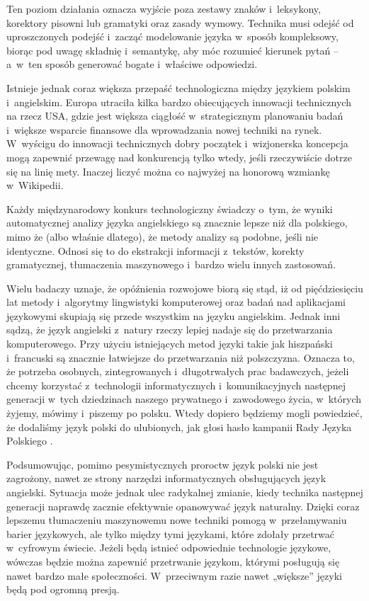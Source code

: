 \begin{multicols}{2}
Ten poziom działania oznacza wyjście poza zestawy znaków
i~leksykony, korektory pisowni lub gramatyki oraz zasady wymowy.
Technika musi odejść od uproszczonych podejść i~zacząć
modelowanie języka w~sposób kompleksowy, biorąc pod uwagę
składnię i~semantykę, aby móc rozumieć kierunek pytań -- a~w~ten
sposób generować bogate i~właściwe odpowiedzi. 

Istnieje jednak coraz większa przepaść technologiczna między
językiem polskim i~angielskim. Europa utraciła kilka bardzo
obiecujących innowacji technicznych na rzecz USA, gdzie jest większa
ciągłość w~strategicznym planowaniu badań i~większe wsparcie
finansowe dla wprowadzania nowej techniki na rynek. W~wyścigu do
innowacji technicznych dobry początek i~wizjonerska koncepcja mogą
zapewnić przewagę nad konkurencją tylko wtedy, jeśli rzeczywiście
dotrze się na linię mety. Inaczej liczyć można co najwyżej na
honorową wzmiankę w~Wikipedii. 

Każdy międzynarodowy konkurs technologiczny świadczy o~tym, że
wyniki automatycznej analizy języka angielskiego są znacznie lepsze
niż dla polskiego, mimo że (albo właśnie dlatego), że metody
analizy są podobne, jeśli nie identyczne. Odnosi się to do
ekstrakcji informacji z~tekstów, korekty gramatycznej, tłumaczenia
maszynowego i~bardzo wielu innych zastosowań. 

Wielu badaczy uznaje, że opóźnienia rozwojowe biorą się stąd,
iż od pięćdziesięciu lat metody i~algorytmy lingwistyki
komputerowej oraz badań nad aplikacjami językowymi skupiają się
przede wszystkim na języku angielskim. Jednak inni sądzą, że
język angielski z~natury rzeczy lepiej nadaje się do przetwarzania
komputerowego. Przy użyciu istniejących metod języki takie jak
hiszpański i~francuski są znacznie łatwiejsze do przetwarzania niż
polszczyzna. Oznacza to, że potrzeba osobnych, zintegrowanych
i~długotrwałych prac badawczych, jeżeli chcemy korzystać
z~technologii informatycznych i~komunikacyjnych następnej generacji
w~tych dziedzinach naszego prywatnego i~zawodowego życia, w~których
żyjemy, mówimy i~piszemy po polsku. Wtedy dopiero będziemy mogli
powiedzieć, że dodaliśmy język polski do ulubionych, jak głosi
hasło kampanii Rady Języka Polskiego \cite{rjp1}. 

Podsumowując, pomimo pesymistycznych proroctw język polski nie jest
zagrożony, nawet ze strony narzędzi informatycznych obsługujących
język angielski. Sytuacja może jednak ulec radykalnej zmianie, kiedy
technika następnej generacji naprawdę zacznie efektywnie opanowywać
język naturalny. Dzięki coraz lepszemu tłumaczeniu maszynowemu nowe
techniki pomogą w~przełamywaniu barier językowych, ale tylko
między tymi językami, które zdołały przetrwać w~cyfrowym
świecie. Jeżeli będą istnieć odpowiednie technologie językowe,
wówczas będzie można zapewnić przetrwanie językom, którymi
posługują się nawet bardzo małe społeczności. W~przeciwnym razie
nawet „większe” języki będą pod ogromną presją. 


\end{multicols}
